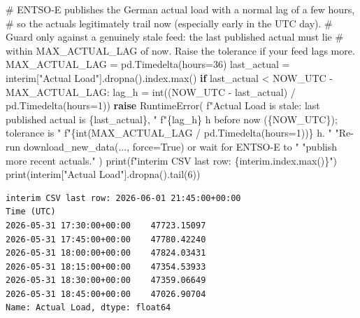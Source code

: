 \documentclass[
  english,
  letterpaper,
]{scrbook}
\newenvironment{Shaded}{\begin{snugshade}}{\end{snugshade}}
\newcommand{\BuiltInTok}[1]{\textcolor[rgb]{0.00,0.23,0.31}{#1}}
\newcommand{\CommentTok}[1]{\textcolor[rgb]{0.37,0.37,0.37}{#1}}
\newcommand{\ControlFlowTok}[1]{\textcolor[rgb]{0.00,0.23,0.31}{\textbf{#1}}}
\newcommand{\DecValTok}[1]{\textcolor[rgb]{0.68,0.00,0.00}{#1}}
\newcommand{\NormalTok}[1]{\textcolor[rgb]{0.00,0.23,0.31}{#1}}
\newcommand{\OperatorTok}[1]{\textcolor[rgb]{0.37,0.37,0.37}{#1}}
\newcommand{\PreprocessorTok}[1]{\textcolor[rgb]{0.68,0.00,0.00}{#1}}
\newcommand{\SpecialCharTok}[1]{\textcolor[rgb]{0.37,0.37,0.37}{#1}}
\newcommand{\SpecialStringTok}[1]{\textcolor[rgb]{0.13,0.47,0.30}{#1}}
\newcommand{\StringTok}[1]{\textcolor[rgb]{0.13,0.47,0.30}{#1}}
\begin{document}
\begin{Shaded}
\begin{Highlighting}[]
\CommentTok{\# ENTSO{-}E publishes the German actual load with a normal lag of a few hours,}
\CommentTok{\# so the actuals legitimately trail \textasciigrave{}now\textasciigrave{} (especially early in the UTC day).}
\CommentTok{\# Guard only against a genuinely stale feed: the last published actual must lie}
\CommentTok{\# within MAX\_ACTUAL\_LAG of now. Raise the tolerance if your feed lags more.}
\NormalTok{MAX\_ACTUAL\_LAG }\OperatorTok{=}\NormalTok{ pd.Timedelta(hours}\OperatorTok{=}\DecValTok{36}\NormalTok{)}
\NormalTok{last\_actual }\OperatorTok{=}\NormalTok{ interim[}\StringTok{"Actual Load"}\NormalTok{].dropna().index.}\BuiltInTok{max}\NormalTok{()}
\ControlFlowTok{if}\NormalTok{ last\_actual }\OperatorTok{\textless{}}\NormalTok{ NOW\_UTC }\OperatorTok{{-}}\NormalTok{ MAX\_ACTUAL\_LAG:}
\NormalTok{    lag\_h }\OperatorTok{=} \BuiltInTok{int}\NormalTok{((NOW\_UTC }\OperatorTok{{-}}\NormalTok{ last\_actual) }\OperatorTok{/}\NormalTok{ pd.Timedelta(hours}\OperatorTok{=}\DecValTok{1}\NormalTok{))}
    \ControlFlowTok{raise} \PreprocessorTok{RuntimeError}\NormalTok{(}
        \SpecialStringTok{f"Actual Load is stale: last published actual is }\SpecialCharTok{\{}\NormalTok{last\_actual}\SpecialCharTok{\}}\SpecialStringTok{, "}
        \SpecialStringTok{f"}\SpecialCharTok{\{}\NormalTok{lag\_h}\SpecialCharTok{\}}\SpecialStringTok{ h before now (}\SpecialCharTok{\{}\NormalTok{NOW\_UTC}\SpecialCharTok{\}}\SpecialStringTok{); tolerance is "}
        \SpecialStringTok{f"}\SpecialCharTok{\{}\BuiltInTok{int}\NormalTok{(MAX\_ACTUAL\_LAG }\OperatorTok{/}\NormalTok{ pd.Timedelta(hours}\OperatorTok{=}\DecValTok{1}\NormalTok{))}\SpecialCharTok{\}}\SpecialStringTok{ h. "}
        \StringTok{"Re{-}run download\_new\_data(..., force=True) or wait for ENTSO{-}E to "}
        \StringTok{"publish more recent actuals."}
\NormalTok{    )}
\BuiltInTok{print}\NormalTok{(}\SpecialStringTok{f"interim CSV last row: }\SpecialCharTok{\{}\NormalTok{interim}\SpecialCharTok{.}\NormalTok{index}\SpecialCharTok{.}\BuiltInTok{max}\NormalTok{()}\SpecialCharTok{\}}\SpecialStringTok{"}\NormalTok{)}
\BuiltInTok{print}\NormalTok{(interim[}\StringTok{"Actual Load"}\NormalTok{].dropna().tail(}\DecValTok{6}\NormalTok{))}
\end{Highlighting}
\end{Shaded}

\begin{verbatim}
interim CSV last row: 2026-06-01 21:45:00+00:00
Time (UTC)
2026-05-31 17:30:00+00:00    47723.15097
2026-05-31 17:45:00+00:00    47780.42240
2026-05-31 18:00:00+00:00    47824.03431
2026-05-31 18:15:00+00:00    47354.53933
2026-05-31 18:30:00+00:00    47359.06649
2026-05-31 18:45:00+00:00    47026.90704
Name: Actual Load, dtype: float64
\end{verbatim}
\end{document}
